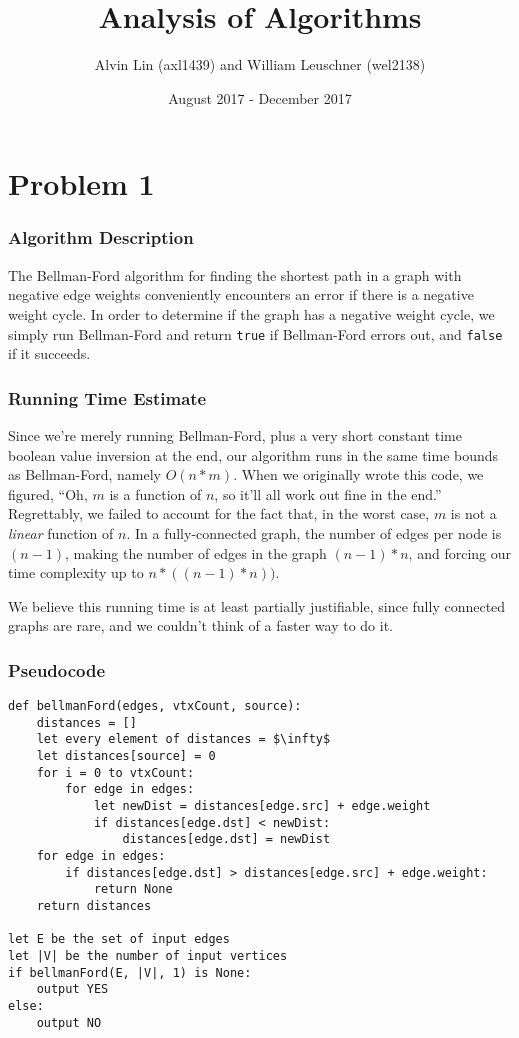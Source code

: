 \documentclass{math}
\title{Analysis of Algorithms}
\author{Alvin Lin (axl1439) and William Leuschner (wel2138)}
\date{August 2017 - December 2017}
\begin{document}
\maketitle

\section*{Problem 1}

\subsubsection*{Algorithm Description}
The Bellman-Ford algorithm for finding the shortest path in a graph with
negative edge weights conveniently encounters an error if there is a negative
weight cycle.  In order to determine if the graph has a negative weight cycle,
we simply run Bellman-Ford and return \texttt{true} if Bellman-Ford errors out,
and \texttt{false} if it succeeds.

\subsubsection*{Running Time Estimate}
Since we're merely running Bellman-Ford, plus a very short constant time boolean
value inversion at the end, our algorithm runs in the same time bounds as
Bellman-Ford, namely \( O(n*m) \).  When we originally wrote this code, we
figured, ``Oh, \( m \) is a function of \( n \), so it'll all work out fine in
the end.''  Regrettably, we failed to account for the fact that, in the worst
case, \( m \) is not a \emph{linear} function of \( n \).  In a fully-connected
graph, the number of edges per node is \( (n - 1) \), making the number of edges
in the graph \( (n - 1) * n \), and forcing our time complexity up to \( n * ((n
- 1) * n)) \).

We believe this running time is at least partially justifiable, since fully
connected graphs are rare, and we couldn't think of a faster way to do it.

\subsubsection*{Pseudocode}

\begin{lstlisting}[mathescape=true]
def bellmanFord(edges, vtxCount, source):
    distances = []
    let every element of distances = $\infty$
    let distances[source] = 0
    for i = 0 to vtxCount:
        for edge in edges:
            let newDist = distances[edge.src] + edge.weight
            if distances[edge.dst] < newDist:
                distances[edge.dst] = newDist
    for edge in edges:
        if distances[edge.dst] > distances[edge.src] + edge.weight:
            return None
    return distances

let E be the set of input edges
let |V| be the number of input vertices
if bellmanFord(E, |V|, 1) is None:
    output YES
else:
    output NO
\end{lstlisting}
\end{document}
